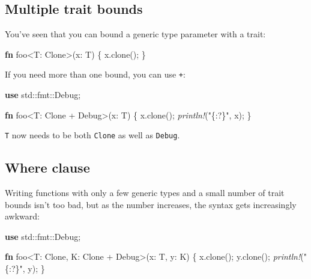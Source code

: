 \documentclass[a4paper,]{book}
\newenvironment{Shaded}{\begin{snugshade}}{\end{snugshade}}
\newcommand{\KeywordTok}[1]{\textcolor[rgb]{0.13,0.29,0.53}{\textbf{{#1}}}}
\newcommand{\StringTok}[1]{\textcolor[rgb]{0.31,0.60,0.02}{{#1}}}
\newcommand{\BuiltInTok}[1]{{#1}}
\newcommand{\PreprocessorTok}[1]{\textcolor[rgb]{0.56,0.35,0.01}{\textit{{#1}}}}
\newcommand{\NormalTok}[1]{{#1}}
\begin{document}
\subsection{Multiple trait bounds}\label{multiple-trait-bounds}

You've seen that you can bound a generic type parameter with a trait:

\begin{Shaded}
\begin{Highlighting}[]
\KeywordTok{fn} \NormalTok{foo<T: }\BuiltInTok{Clone}\NormalTok{>(x: T) \{}
    \NormalTok{x.clone();}
\NormalTok{\}}
\end{Highlighting}
\end{Shaded}

If you need more than one bound, you can use \texttt{+}:

\begin{Shaded}
\begin{Highlighting}[]
\KeywordTok{use} \NormalTok{std::fmt::}\BuiltInTok{Debug}\NormalTok{;}

\KeywordTok{fn} \NormalTok{foo<T: }\BuiltInTok{Clone} \NormalTok{+ }\BuiltInTok{Debug}\NormalTok{>(x: T) \{}
    \NormalTok{x.clone();}
    \PreprocessorTok{println!}\NormalTok{(}\StringTok{"\{:?\}"}\NormalTok{, x);}
\NormalTok{\}}
\end{Highlighting}
\end{Shaded}

\texttt{T} now needs to be both \texttt{Clone} as well as
\texttt{Debug}.

\subsection{Where clause}\label{where-clause}

Writing functions with only a few generic types and a small number of
trait bounds isn't too bad, but as the number increases, the syntax gets
increasingly awkward:

\begin{Shaded}
\begin{Highlighting}[]
\KeywordTok{use} \NormalTok{std::fmt::}\BuiltInTok{Debug}\NormalTok{;}

\KeywordTok{fn} \NormalTok{foo<T: }\BuiltInTok{Clone}\NormalTok{, K: }\BuiltInTok{Clone} \NormalTok{+ }\BuiltInTok{Debug}\NormalTok{>(x: T, y: K) \{}
    \NormalTok{x.clone();}
    \NormalTok{y.clone();}
    \PreprocessorTok{println!}\NormalTok{(}\StringTok{"\{:?\}"}\NormalTok{, y);}
\NormalTok{\}}
\end{Highlighting}
\end{Shaded}
\end{document}

